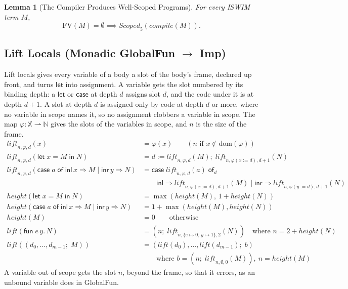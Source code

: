\documentclass[10pt]{article}
\theoremstyle{acmplain}
\newtheorem{lemma}[theorem]{Lemma}
\newcommand{\key}[1]{\mathsf{#1}}
\newcommand{\pass}[1]{\mathit{#1}}
\newcommand{\Let}{\key{let}\;}
\newcommand{\In}{\;\key{in}\;}
\newcommand{\Case}[5]{\key{case}\;#1\;\key{of}\;\key{inl}\,#2 \Rightarrow #3 \mid \key{inr}\,#4 \Rightarrow #5}
\newcommand{\X}{\mathbb{X}}
\newcommand{\FV}{\mathrm{FV}}
\newcommand{\ext}[3]{#1(#2{:=}#3)}
\newcommand{\assign}[3]{#1 \mathrel{:=} #2;\; #3}
\begin{document}
\begin{lemma}[The Compiler Produces Well-Scoped Programs]\label{lem:compile-scoped}
For every ISWIM term $M$,
\[
  \FV(M) = \emptyset \implies \mathit{Scoped}_5(\pass{compile}(M)) .
\]
\end{lemma}

\subsection{Lift Locals (Monadic GlobalFun \texorpdfstring{$\to$}{->} Imp)}

Lift locals gives every variable of a body a slot of the body's frame,
declared up front, and turns $\key{let}$ into assignment. A variable gets
the slot numbered by its binding depth: a $\key{let}$ or $\key{case}$ at
depth $d$ assigns slot $d$, and the code under it is at depth $d+1$.
A slot at depth $d$ is assigned only by code at depth $d$ or more, where
no variable in scope names it, so no assignment clobbers a variable in
scope. The map $\varphi : \X \rightharpoonup \mathbb{N}$ gives the slots
of the variables in scope, and $n$ is the size of the frame.
\begin{align*}
  \pass{lift}_{n,\varphi,d}(x) &= \varphi(x)
    \qquad (n \text{ if } x \notin \mathrm{dom}(\varphi)) \\
  \pass{lift}_{n,\varphi,d}(\Let x = M \In N) &=
    \assign{d}{\pass{lift}_{n,\varphi,d}(M)}{\pass{lift}_{n,\ext{\varphi}{x}{d},d+1}(N)} \\
  \pass{lift}_{n,\varphi,d}(\Case{a}{x}{M}{y}{N}) &=
    \key{case}\;\pass{lift}_{n,\varphi,d}(a)\;\key{of}_{d} \\
  &\qquad \key{inl} \Rightarrow \pass{lift}_{n,\ext{\varphi}{x}{d},d+1}(M)
    \mid \key{inr} \Rightarrow \pass{lift}_{n,\ext{\varphi}{y}{d},d+1}(N) \\[1ex]
  \mathit{height}(\Let x = M \In N) &= \max(\mathit{height}(M),\, 1 + \mathit{height}(N)) \\
  \mathit{height}(\Case{a}{x}{M}{y}{N}) &= 1 + \max(\mathit{height}(M), \mathit{height}(N)) \\
  \mathit{height}(M) &= 0 \qquad \text{otherwise} \\[1ex]
  \pass{lift}(\key{fun}\; e\,y.\,N) &= (n;\; \pass{lift}_{n,\{e \mapsto 0,\, y \mapsto 1\},2}(N))
    \quad\text{where } n = 2 + \mathit{height}(N) \\
  \pass{lift}((d_0, \ldots, d_{m-1};\; M)) &=
    (\pass{lift}(d_0), \ldots, \pass{lift}(d_{m-1});\; b) \\
  &\qquad\text{where } b = (n;\; \pass{lift}_{n,\emptyset,0}(M)),\ n = \mathit{height}(M)
\end{align*}
A variable out of scope gets the slot $n$, beyond the frame, so that it
errors, as an unbound variable does in GlobalFun.
\end{document}

